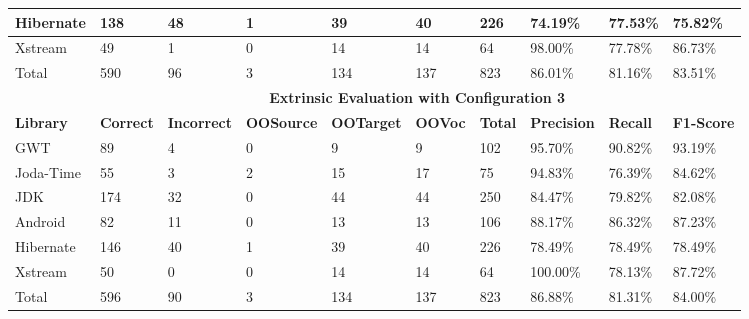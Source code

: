 \begin{table*}[t]
\begin{tabular}{|l|l|l|l|l|l|l|l|l|l|}
Hibernate & 138     & 48        & 1        & 39       & 40    & 226   & 74.19\%   & 77.53\% & 75.82\%  \\ \hline
Xstream   & 49      & 1         & 0        & 14       & 14    & 64    & 98.00\%   & 77.78\% & 86.73\%  \\ \hline
Total     & 590     & 96        & 3        & 134      & 137   & 823   & 86.01\%   & 81.16\% & 83.51\%  \\ \hline
          & \multicolumn{9}{c|}{\textbf{Extrinsic Evaluation with Configuration 3}}                             \\ \hline
\textbf{Library}   & \textbf{Correct} & \textbf{Incorrect} & \textbf{OOSource} & \textbf{OOTarget} & \textbf{OOVoc}  & \textbf{Total}   & \textbf{Precision} & \textbf{Recall}  & \textbf{F1-Score} \\ \hline
GWT       & 89      & 4         & 0        & 9        & 9     & 102   & 95.70\%   & 90.82\% & 93.19\%  \\ \hline
Joda-Time & 55      & 3         & 2        & 15       & 17    & 75    & 94.83\%   & 76.39\% & 84.62\%  \\ \hline
JDK       & 174     & 32        & 0        & 44       & 44    & 250   & 84.47\%   & 79.82\% & 82.08\%  \\ \hline
Android   & 82      & 11        & 0        & 13       & 13    & 106   & 88.17\%   & 86.32\% & 87.23\%  \\ \hline
Hibernate & 146     & 40        & 1        & 39       & 40    & 226   & 78.49\%   & 78.49\% & 78.49\%  \\ \hline
Xstream   & 50      & 0         & 0        & 14       & 14    & 64    & 100.00\%  & 78.13\% & 87.72\%  \\ \hline
Total     & 596     & 90        & 3        & 134      & 137   & 823   & 86.88\%   & 81.31\% & 84.00\%  \\ \hline
\end{tabular}

\label{tbl:Extrinsic}
\end{table*}